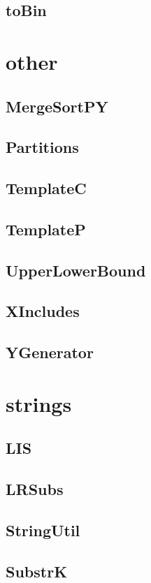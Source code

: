 \subsection{ toBin}
\raggedbottom
\hrulefill

\section{other}
\subsection{ MergeSortPY}
\raggedbottom
\hrulefill
\subsection{ Partitions}
\raggedbottom
\hrulefill
\subsection{ TemplateC}
\raggedbottom
\hrulefill
\subsection{ TemplateP}
\raggedbottom
\hrulefill
\subsection{ UpperLowerBound}
\raggedbottom
\hrulefill
\subsection{ XIncludes}
\raggedbottom
\hrulefill
\subsection{ YGenerator}
\raggedbottom
\hrulefill

\section{strings}
\subsection{ LIS}
\raggedbottom
\hrulefill
\subsection{ LRSubs}
\raggedbottom
\hrulefill
\subsection{ StringUtil}
\raggedbottom
\hrulefill
\subsection{ SubstrK}
\raggedbottom
\hrulefill

